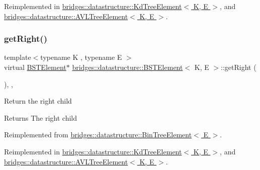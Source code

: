 Reimplemented in \hyperlink{classbridges_1_1datastructure_1_1_kd_tree_element_a653597918fbc6e31b84fcf8dbdf67122}{bridges\+::datastructure\+::\+Kd\+Tree\+Element$<$ K, E $>$}, and \hyperlink{classbridges_1_1datastructure_1_1_a_v_l_tree_element_a4a639e0c623435aadf5c51ed132cb25d}{bridges\+::datastructure\+::\+A\+V\+L\+Tree\+Element$<$ K, E $>$}.

\mbox{\label{classbridges_1_1datastructure_1_1_b_s_t_element_a80f5085d6d03805dd3091b7693d8e235}} 
\subsubsection{\texorpdfstring{get\+Right()}{getRight()}\hspace{0.1cm}{\footnotesize\ttfamily [1/2]}}
{\footnotesize\ttfamily template$<$typename K , typename E $>$ \\
virtual \hyperlink{classbridges_1_1datastructure_1_1_b_s_t_element}{B\+S\+T\+Element}$\ast$ \hyperlink{classbridges_1_1datastructure_1_1_b_s_t_element}{bridges\+::datastructure\+::\+B\+S\+T\+Element}$<$ K, E $>$\+::get\+Right (\begin{DoxyParamCaption}{ }\end{DoxyParamCaption})\hspace{0.3cm}{\ttfamily [inline]}, {\ttfamily [override]}, {\ttfamily [virtual]}}

Return the right child \begin{DoxyReturn}{Returns}
The right child 
\end{DoxyReturn}


Reimplemented from \hyperlink{classbridges_1_1datastructure_1_1_bin_tree_element_ae1e6bde8cc03cf5da5a7930354fdf592}{bridges\+::datastructure\+::\+Bin\+Tree\+Element$<$ E $>$}.



Reimplemented in \hyperlink{classbridges_1_1datastructure_1_1_kd_tree_element_a366e3b0987169220d3a145043be2373d}{bridges\+::datastructure\+::\+Kd\+Tree\+Element$<$ K, E $>$}, and \hyperlink{classbridges_1_1datastructure_1_1_a_v_l_tree_element_aed585fdf56fcbfebac6cd0262c9c1807}{bridges\+::datastructure\+::\+A\+V\+L\+Tree\+Element$<$ K, E $>$}.


